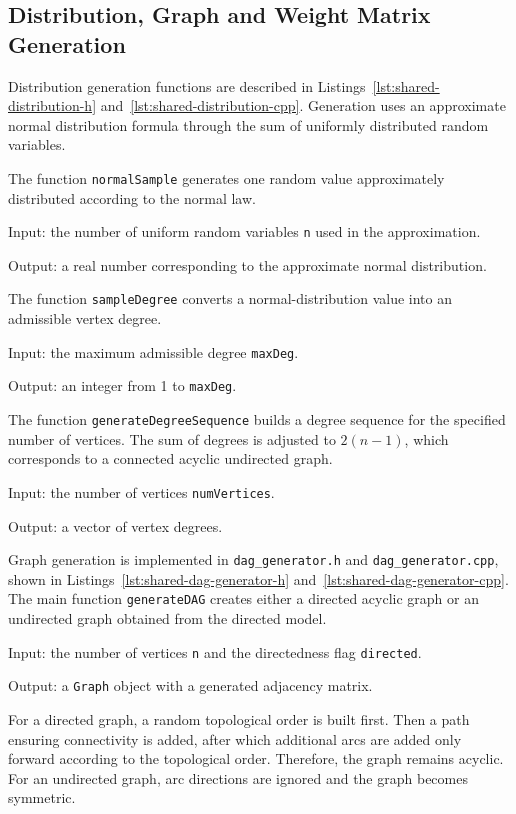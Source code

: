 \documentclass[a4paper,final]{article}
\begin{document}
\subsection{Distribution, Graph and Weight Matrix Generation}

Distribution generation functions are described in Listings~\ref{lst:shared-distribution-h} and~\ref{lst:shared-distribution-cpp}. Generation uses an approximate normal distribution formula through the sum of uniformly distributed random variables.

The function \texttt{normalSample} generates one random value approximately distributed according to the normal law.

Input: the number of uniform random variables \texttt{n} used in the approximation.

Output: a real number corresponding to the approximate normal distribution.

The function \texttt{sampleDegree} converts a normal-distribution value into an admissible vertex degree.

Input: the maximum admissible degree \texttt{maxDeg}.

Output: an integer from 1 to \texttt{maxDeg}.

The function \texttt{generateDegreeSequence} builds a degree sequence for the specified number of vertices. The sum of degrees is adjusted to $2(n-1)$, which corresponds to a connected acyclic undirected graph.

Input: the number of vertices \texttt{numVertices}.

Output: a vector of vertex degrees.

Graph generation is implemented in \texttt{dag\_generator.h} and \texttt{dag\_generator.cpp}, shown in Listings~\ref{lst:shared-dag-generator-h} and~\ref{lst:shared-dag-generator-cpp}. The main function \texttt{generateDAG} creates either a directed acyclic graph or an undirected graph obtained from the directed model.

Input: the number of vertices \texttt{n} and the directedness flag \texttt{directed}.

Output: a \texttt{Graph} object with a generated adjacency matrix.

For a directed graph, a random topological order is built first. Then a path ensuring connectivity is added, after which additional arcs are added only forward according to the topological order. Therefore, the graph remains acyclic. For an undirected graph, arc directions are ignored and the graph becomes symmetric.
\end{document}
